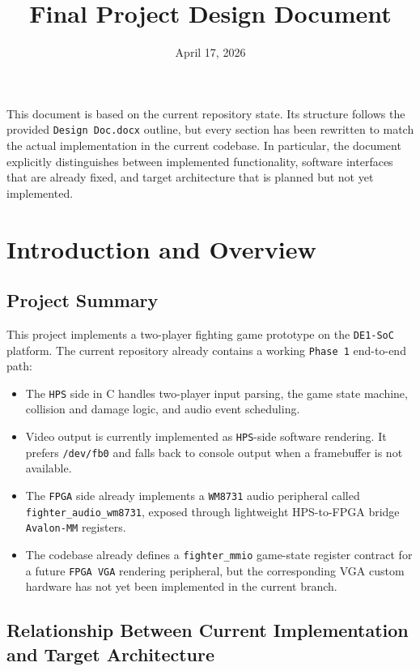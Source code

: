 \documentclass[12pt,a4paper]{article}
\title{Final Project Design Document}
\author{}
\date{April 17, 2026}
\begin{document}
\maketitle

This document is based on the current repository state. Its structure follows the provided \texttt{Design Doc.docx} outline, but every section has been rewritten to match the actual implementation in the current codebase. In particular, the document explicitly distinguishes between implemented functionality, software interfaces that are already fixed, and target architecture that is planned but not yet implemented.

\section{Introduction and Overview}

\subsection{Project Summary}

This project implements a two-player fighting game prototype on the \texttt{DE1-SoC} platform. The current repository already contains a working \texttt{Phase 1} end-to-end path:

\begin{itemize}
  \item The \texttt{HPS} side in C handles two-player input parsing, the game state machine, collision and damage logic, and audio event scheduling.
  \item Video output is currently implemented as \texttt{HPS}-side software rendering. It prefers \texttt{/dev/fb0} and falls back to console output when a framebuffer is not available.
  \item The \texttt{FPGA} side already implements a \texttt{WM8731} audio peripheral called \texttt{fighter\_audio\_wm8731}, exposed through lightweight HPS-to-FPGA bridge \texttt{Avalon-MM} registers.
  \item The codebase already defines a \texttt{fighter\_mmio} game-state register contract for a future \texttt{FPGA VGA} rendering peripheral, but the corresponding VGA custom hardware has not yet been implemented in the current branch.
\end{itemize}

\subsection{Relationship Between Current Implementation and Target Architecture}
\end{document}
